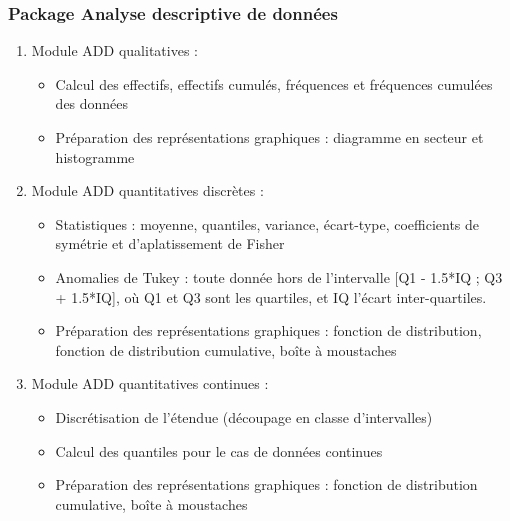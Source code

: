 			\subsubsection*{Package Analyse descriptive de données}
			\begin{enumerate}
				\item Module ADD qualitatives :
					\begin{itemize}[leftmargin=*]
					\item Calcul des effectifs, effectifs cumulés, fréquences et fréquences cumulées des données
					\item Préparation des représentations graphiques : diagramme en secteur et histogramme
					\end{itemize}
				\item Module ADD quantitatives discrètes :
					\begin{itemize}[leftmargin=*]
					\item Statistiques : moyenne, quantiles, variance, écart-type, coefficients de symétrie et d'aplatissement de Fisher
					\item Anomalies de Tukey : toute donnée hors de l'intervalle [Q1 - 1.5*IQ ; Q3 + 1.5*IQ], où Q1 et Q3 sont les quartiles, et IQ l'écart inter-quartiles.
					\item Préparation des représentations graphiques : fonction de distribution, fonction de distribution cumulative, boîte à moustaches
					\end{itemize}
				\item Module ADD quantitatives continues :
					\begin{itemize}[leftmargin=*]
					\item Discrétisation de l'étendue (découpage en classe d'intervalles)
					\item Calcul des quantiles pour le cas  de données continues
					\item Préparation des représentations graphiques : fonction de distribution cumulative, boîte à moustaches
					\end{itemize}
			\end{enumerate}
			
